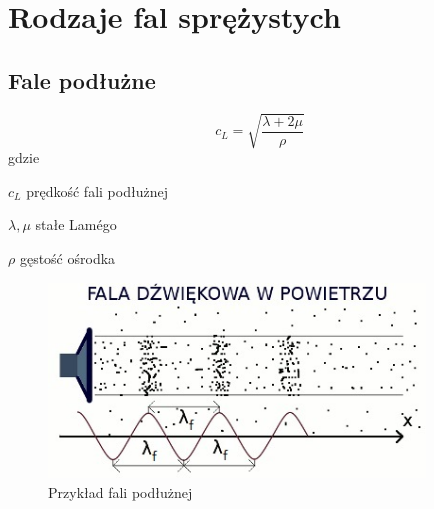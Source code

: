 
\section{Rodzaje fal sprężystych}
\label{sec:rodzaje_fal_sprezystych}

\subsection{Fale podłużne}

\begin{equation}
c_L=\sqrt{\frac{\lambda+2\mu}{\rho}}
\end{equation}
gdzie
\begin{eqwhere}[2cm]
        \item[$c_L$] prędkość fali podłużnej
        \item[$\lambda, \mu$] stałe Lam\'{e}go
        \item[$\rho$] gęstość ośrodka
\end{eqwhere}

\begin{figure}[h]
\centering
\includegraphics[width=10cm]{Zdjecia/2/fala_podluzna}
\caption{Przykład fali podłużnej}
\label{fig:fala_podluzna}
\end{figure}



